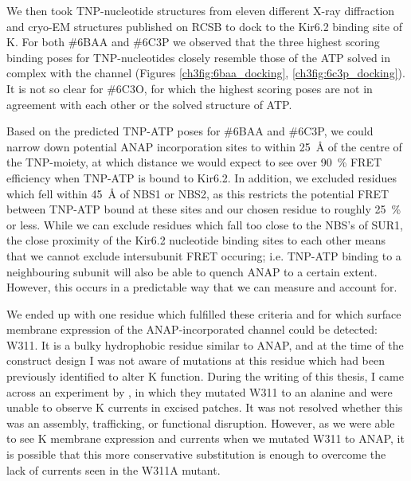 We then took TNP-nucleotide structures from eleven different X-ray diffraction and cryo-EM structures published on RCSB to dock to the Kir6.2 binding site of K\ATP{}.
For both \#6BAA and \#6C3P we observed that the three highest scoring binding poses for TNP-nucleotides closely resemble those of the ATP solved in complex with the channel (Figures \ref{ch3fig:6baa_docking}, \ref{ch3fig:6c3p_docking}).
It is not so clear for \#6C3O, for which the highest scoring poses are not in agreement with each other or the solved structure of ATP.

Based on the predicted TNP-ATP poses for \#6BAA and \#6C3P, we could narrow down potential ANAP incorporation sites to within \SI{25}{\angstrom} of the centre of the TNP-moiety, at which distance we would expect to see over \SI{90}{\percent} FRET efficiency when TNP-ATP is bound to Kir6.2.
In addition, we excluded residues which fell within \SI{45}{\angstrom} of NBS1 or NBS2, as this restricts the potential FRET between TNP-ATP bound at these sites and our chosen residue to roughly \SI{25}{\percent} or less.
While we can exclude residues which fall too close to the NBS's of SUR1, the close proximity of the Kir6.2 nucleotide binding sites to each other means that we cannot exclude intersubunit FRET occuring; i.e. TNP-ATP binding to a neighbouring subunit will also be able to quench ANAP to a certain extent. However, this occurs in a predictable way that we can measure and account for.

We ended up with one residue which fulfilled these criteria and for which surface membrane expression of the ANAP-incorporated channel could be detected: W311.
It is a bulky hydrophobic residue similar to ANAP, and at the time of the construct design I was not aware of mutations at this residue which had been previously identified to alter K\ATP{} function.
During the writing of this thesis, I came across an experiment by \textcite{cukras_structural_2002}, in which they mutated W311 to an alanine and were unable to observe K\ATP{} currents in excised patches.
It was not resolved whether this was an assembly, trafficking, or functional disruption.
However, as we were able to see K\ATP{} membrane expression and currents when we mutated W311 to ANAP, it is possible that this more conservative substitution is enough to overcome the lack of currents seen in the W311A mutant.

